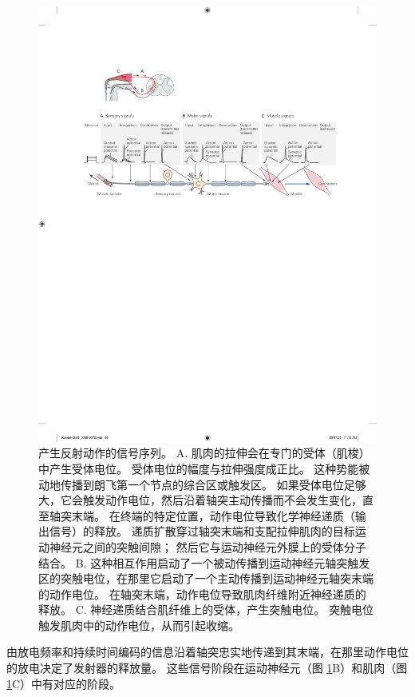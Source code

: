 \begin{figure}[htbp]
	\centering
	\includegraphics[width=1.0\linewidth]{chap03/fig_3_10}
	\caption{产生反射动作的信号序列。 
		A. 肌肉的拉伸会在专门的受体（肌梭）中产生受体电位。 
		受体电位的幅度与拉伸强度成正比。 
		这种势能被动地传播到朗飞第一个节点的综合区或触发区。 
		如果受体电位足够大，它会触发动作电位，然后沿着轴突主动传播而不会发生变化，直至轴突末端。 
		在终端的特定位置，动作电位导致化学神经递质（输出信号）的释放。 
		递质扩散穿过轴突末端和支配拉伸肌肉的目标运动神经元之间的突触间隙； 
		然后它与运动神经元外膜上的受体分子结合。 
		B. 这种相互作用启动了一个被动传播到运动神经元轴突触发区的突触电位，在那里它启动了一个主动传播到运动神经元轴突末端的动作电位。 
		在轴突末端，动作电位导致肌肉纤维附近神经递质的释放。 
		C. 神经递质结合肌纤维上的受体，产生突触电位。 
		突触电位触发肌肉中的动作电位，从而引起收缩。}
	\label{fig:3_10}
\end{figure}


由放电频率和持续时间编码的信息沿着轴突忠实地传递到其末端，在那里动作电位的放电决定了发射器的释放量。 
这些信号阶段在运动神经元（图 \ref{fig:3_10}B）和肌肉（图 \ref{fig:3_10}C）中有对应的阶段。


